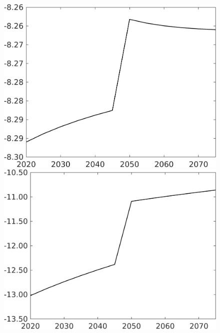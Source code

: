 \documentclass[12pt]{article}
\begin{document}
\begin{figure}[h!!]
\begin{minipage}[]{0.32\textwidth}
\end{minipage}
\begin{minipage}[]{0.32\textwidth}
\includegraphics[width=1\textwidth]{../../codding_model/own_basedOnFried/optimalPol_010922_revision/figures/all_13Sept22/CompTaufPER_bytaul_Reg0_Ln_spillover0_nsk0_xgr0_knspil0_sep0_LFlimit1_emsbase0_countec0_GovRev0_etaa0.79_lgd0.png}
\end{minipage}			
\begin{minipage}[]{0.32\textwidth}
\includegraphics[width=1\textwidth]{../../codding_model/own_basedOnFried/optimalPol_010922_revision/figures/all_13Sept22/CompTaufPER_bytaul_Reg0_GFF_spillover0_nsk0_xgr0_knspil0_sep0_LFlimit1_emsbase0_countec0_GovRev0_etaa0.79_lgd0.png}

\end{minipage}
\end{figure}
\end{document}
